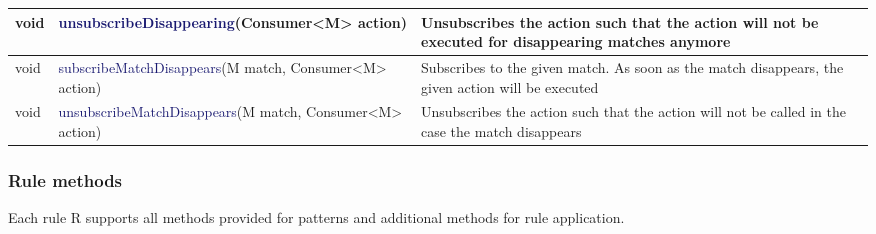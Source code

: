 {\begin{center}
\begin{tabular}{ | m{4.25cm} | m{4.25cm} | m{4.5cm} | }
\hline
\textsf{void} & \textcolor{MidnightBlue}{unsubscribeDisappearing\newline}(Consumer<M> action) & Unsubscribes the action such that the action will not be executed for disappearing matches anymore \\
\hline
\textsf{void} & \textcolor{MidnightBlue}{subscribeMatchDisappears\newline}(M match, Consumer<M> action) & Subscribes to the given match. As soon as the match disappears, the given action will be executed \\
\hline
\textsf{void} & \textcolor{MidnightBlue}{unsubscribeMatchDisappears\newline}(M match, Consumer<M> action) & Unsubscribes the action such that the action will not be called in the case the match disappears \\
\hline

\end{tabular}
\end{center}

}


\subsubsection{Rule methods}

Each rule R supports all methods provided for patterns and additional methods for rule application.

